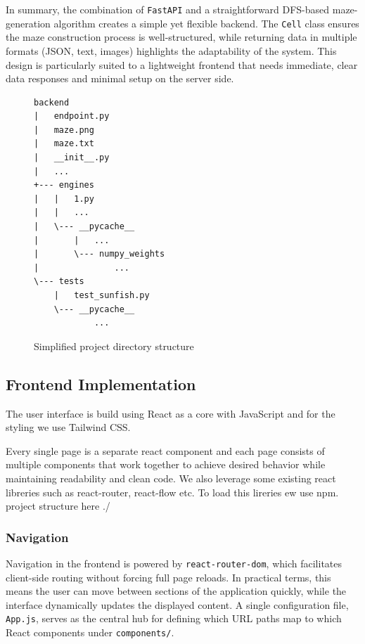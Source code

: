 \documentclass[12pt,a4paper]{article}
\begin{document}
In summary, the combination of \texttt{FastAPI} and a straightforward DFS-based maze-generation algorithm creates a simple yet flexible backend. The \texttt{Cell} class ensures the maze construction process is well-structured, while returning data in multiple formats (JSON, text, images) highlights the adaptability of the system. This design is particularly suited to a lightweight frontend that needs immediate, clear data responses and minimal setup on the server side.
\begin{figure}[ht]
  \begin{center}
    \begin{minipage}{0.4\linewidth}
      \begin{lstlisting}[numbers=none,frame=none,basicstyle=\ttfamily\footnotesize,breaklines=true]
backend
|   endpoint.py
|   maze.png
|   maze.txt
|   __init__.py
|   ...
+--- engines
|   |   1.py
|   |   ...
|   \--- __pycache__
|       |   ...
|       \--- numpy_weights
|               ...
\--- tests
    |   test_sunfish.py
    \--- __pycache__
            ...
      \end{lstlisting}
    \end{minipage}
  \end{center}
  \caption{Simplified project directory structure }
  \label{fig:directory-structure}
\end{figure}


  \subsection{Frontend Implementation}
  The user interface is build using React as a core with JavaScript and for the styling we use Tailwind CSS. 

  Every single page is a separate react component and each page consists of multiple components that work together to achieve desired behavior while maintaining readability and clean code. We also leverage some existing react libreries such as react-router, react-flow etc. To load this lireries ew use npm.
  project structure here ./
  \subsubsection{Navigation}

Navigation in the frontend is powered by \texttt{react-router-dom}, which 
facilitates client-side routing without forcing full page reloads. In practical 
terms, this means the user can move between sections of the application quickly, 
while the interface dynamically updates the displayed content. A single 
configuration file, \texttt{App.js}, serves as the central hub for defining 
which URL paths map to which React components under \texttt{components/}.
\end{document}
